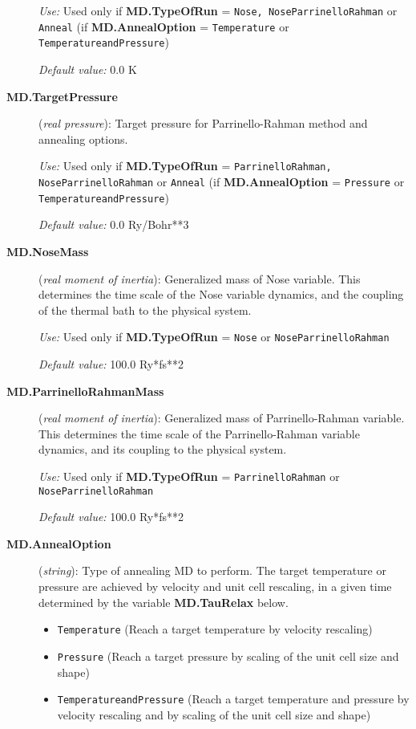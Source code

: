 \begin{description}
{\it Use:} Used only if {\bf MD.TypeOfRun} = {\tt Nose, NoseParrinelloRahman}
or {\tt Anneal} (if {\bf MD.AnnealOption} = {\tt Temperature} or 
{\tt TemperatureandPressure})

{\it Default value:} 0.0 K

\item[{\bf MD.TargetPressure}] ({\it real pressure}): Target pressure
for Parrinello-Rahman method and annealing options.

{\it Use:} Used only if {\bf MD.TypeOfRun} = {\tt ParrinelloRahman, 
NoseParrinelloRahman} or {\tt Anneal} (if {\bf MD.AnnealOption} = 
{\tt Pressure} or {\tt TemperatureandPressure})

{\it Default value:} 0.0 Ry/Bohr**3

\item[{\bf MD.NoseMass}] ({\it real moment of inertia}): 
Generalized mass of Nose variable.
This determines the time scale of the Nose variable
dynamics, and the coupling of the thermal bath to
the physical system.

{\it Use:} Used only if {\bf MD.TypeOfRun} = {\tt Nose} or 
{\tt NoseParrinelloRahman}

{\it Default value:} 100.0 Ry*fs**2

\item[{\bf MD.ParrinelloRahmanMass}] ({\it real moment of inertia}): 
Generalized mass of Parrinello-Rahman variable.
This determines the time scale 
of the Parrinello-Rahman variable
dynamics, and its coupling to
the physical system.

{\it Use:} Used only if {\bf MD.TypeOfRun} = {\tt ParrinelloRahman} 
or {\tt NoseParrinelloRahman}

{\it Default value:} 100.0 Ry*fs**2

\item[{\bf MD.AnnealOption}] ({\it string}): Type of annealing MD to
perform. The target temperature or pressure are
achieved by velocity and unit cell rescaling, 
in a given time determined by the variable
{\bf MD.TauRelax} below.
\begin{itemize}
\item {\tt Temperature} (Reach a target temperature by velocity rescaling)
\item {\tt Pressure} (Reach a target pressure by scaling of the unit
cell size and shape)
\item {\tt TemperatureandPressure}  (Reach a target temperature 
and pressure by velocity rescaling and by scaling of the unit
cell size and shape)
\end{itemize}


\end{description}

